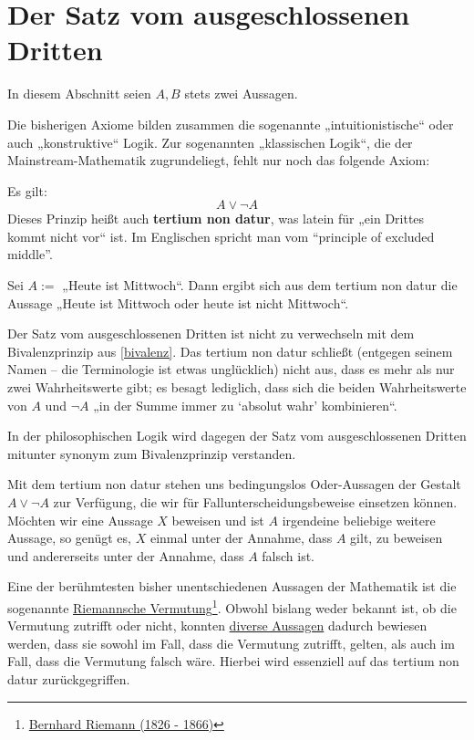 \section{Der Satz vom ausgeschlossenen Dritten}


In diesem Abschnitt seien $A,B$ stets zwei Aussagen.

Die bisherigen Axiome bilden zusammen die sogenannte „intuitionistische“ oder auch „konstruktive“ Logik. Zur sogenannten „klassischen Logik“, die der Mainstream-Mathematik zugrundeliegt, fehlt nur noch das folgende Axiom:


\begin{axiom} \label{excludedmiddle}  
    Es gilt:
        \[ A\lor \neg A \]
    Dieses Prinzip heißt auch \textbf{tertium non datur}, was latein für „ein Drittes kommt nicht vor“ ist. Im Englischen spricht man vom ``principle of excluded middle''.
\end{axiom}


\begin{bsp}
    Sei $A:=$ „Heute ist Mittwoch“. Dann ergibt sich aus dem tertium non datur die Aussage „Heute ist Mittwoch oder heute ist nicht Mittwoch“.
\end{bsp}


\begin{bem}
    Der Satz vom ausgeschlossenen Dritten ist nicht zu verwechseln mit dem Bivalenzprinzip aus \cref{bivalenz}. Das tertium non datur schließt (entgegen seinem Namen -- die Terminologie ist etwas unglücklich) nicht aus, dass es mehr als nur zwei Wahrheitswerte gibt; es besagt lediglich, dass sich die beiden Wahrheitswerte von $A$ und $\neg A$ „in der Summe immer zu `absolut wahr' kombinieren“.
    
    In der philosophischen Logik wird dagegen der Satz vom ausgeschlossenen Dritten mitunter synonym zum Bivalenzprinzip verstanden.
\end{bem}


\begin{bem}
    Mit dem tertium non datur stehen uns bedingungslos Oder-Aussagen der Gestalt $A\lor \neg A$ zur Verfügung, die wir für Fallunterscheidungsbeweise einsetzen können. Möchten wir eine Aussage $X$ beweisen und ist $A$ irgendeine beliebige weitere Aussage, so genügt es, $X$ einmal unter der Annahme, dass $A$ gilt, zu beweisen und andererseits unter der Annahme, dass $A$ falsch ist.
    
    Eine der berühmtesten bisher unentschiedenen Aussagen der Mathematik ist die sogenannte \href{https://de.wikipedia.org/wiki/Riemannsche_Vermutung}{Riemannsche Vermutung}\footnote{\href{https://de.wikipedia.org/wiki/Bernhard_Riemann}{Bernhard Riemann (1826 - 1866)}}. Obwohl bislang weder bekannt ist, ob die Vermutung zutrifft oder nicht, konnten \href{https://en.wikipedia.org/wiki/Riemann_hypothesis#Excluded_middle}{diverse Aussagen} dadurch bewiesen werden, dass sie sowohl im Fall, dass die Vermutung zutrifft, gelten, als auch im Fall, dass die Vermutung falsch wäre. Hierbei wird essenziell auf das tertium non datur zurückgegriffen.
\end{bem}


